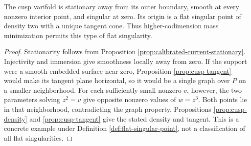 \begin{corollary}\label{cor:cusp-flat-singular}
The cusp varifold is stationary away from its outer boundary, smooth at every nonzero interior point, and singular at zero. Its origin is a flat singular point of density two with a unique tangent cone. Thus higher-codimension mass minimization permits this type of flat singularity.
\end{corollary}
\begin{proof}
Stationarity follows from Proposition \ref{prop:calibrated-current-stationary}. Injectivity and immersion give smoothness locally away from zero. If the support were a smooth embedded surface near zero, Proposition \ref{prop:cusp-tangent} would make its tangent plane horizontal, so it would be a single graph over $P$ on a smaller neighborhood. For each sufficiently small nonzero $v$, however, the two parameters solving $z^2=v$ give opposite nonzero values of $w=z^3$. Both points lie in that neighborhood, contradicting the graph property. Propositions \ref{prop:cusp-density} and \ref{prop:cusp-tangent} give the stated density and tangent. This is a concrete example under Definition \ref{def:flat-singular-point}, not a classification of all flat singularities.
\end{proof}
